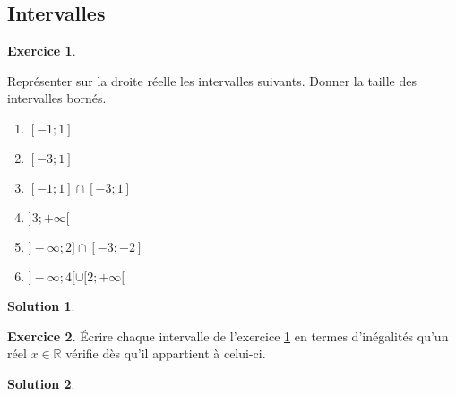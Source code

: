 \documentclass[a4paper, 14pt]{extarticle}
\theoremstyle{plain}
\newtheorem*{sol}{Solution}
\theoremstyle{definition}
\newtheorem{ex}{Exercice}
\newcommand{\R}{\mathbb{R}}
\newif\ifsolutions
\newcommand{\exe}[2]{
		\begin{ex} #1  \end{ex}
		\begin{sol} #2 \end{sol}
	}
\newcommand{\exe}[2]{
		\begin{ex} #1  \end{ex}
	}
\begin{document}
\pagestyle{fancy}
\fancyhead[C]{\textbf{ Droite réelle \ifsolutions -- Solutions  \fi}}
\fancyhead[R]{\today}

\subsection*{Intervalles}

\begin{center}
	
\end{center}

\exe{\label{ex:1}


	Représenter sur la droite réelle les intervalles suivants. Donner la taille des intervalles bornés.
	\begin{multicols}{2}
	\begin{enumerate}
		\item $[-1 ; 1]$
		\item $[-3 ; 1]$
		\item $[-1 ; 1] \cap [-3 ; 1]$
		\item $]3 ; +\infty [$
		\item $] {-}\infty ; 2] \cap [-3 ; -2]$
		\item $]{-}\infty ; 4 [ \cup [2 ; +\infty[$
	\end{enumerate}
	\end{multicols}
	
	
}
{}


\begin{center}
\end{center}


\exe{
	Écrire chaque intervalle de l'exercice \ref{ex:1} en termes d'inégalités qu'un réel $x \in \R$ vérifie dès qu'il appartient à celui-ci.
}
{}
\end{document}

